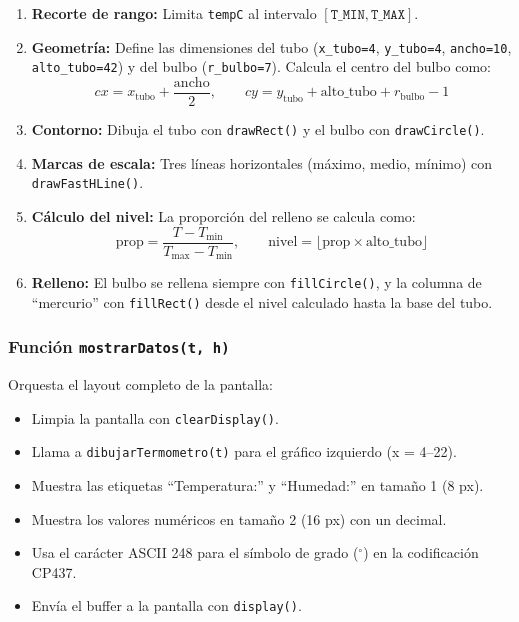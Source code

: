 \documentclass[12pt,a4paper]{article}
\begin{document}
\begin{enumerate}
    \item \textbf{Recorte de rango:} Limita \texttt{tempC} al intervalo $[\texttt{T\_MIN}, \texttt{T\_MAX}]$.
    \item \textbf{Geometría:} Define las dimensiones del tubo (\texttt{x\_tubo=4}, \texttt{y\_tubo=4}, \texttt{ancho=10}, \texttt{alto\_tubo=42}) y del bulbo (\texttt{r\_bulbo=7}). Calcula el centro del bulbo como:
    \begin{equation*}
        cx = x_{\text{tubo}} + \frac{\text{ancho}}{2}, \qquad cy = y_{\text{tubo}} + \text{alto\_tubo} + r_{\text{bulbo}} - 1
    \end{equation*}
    \item \textbf{Contorno:} Dibuja el tubo con \texttt{drawRect()} y el bulbo con \texttt{drawCircle()}.
    \item \textbf{Marcas de escala:} Tres líneas horizontales (máximo, medio, mínimo) con \texttt{drawFastHLine()}.
    \item \textbf{Cálculo del nivel:} La proporción del relleno se calcula como:
    \begin{equation*}
        \text{prop} = \frac{T - T_{\min}}{T_{\max} - T_{\min}}, \qquad \text{nivel} = \lfloor \text{prop} \times \text{alto\_tubo} \rfloor
    \end{equation*}
    \item \textbf{Relleno:} El bulbo se rellena siempre con \texttt{fillCircle()}, y la columna de ``mercurio'' con \texttt{fillRect()} desde el nivel calculado hasta la base del tubo.
\end{enumerate}

\subsubsection*{Función \texttt{mostrarDatos(t, h)}}
Orquesta el layout completo de la pantalla:
\begin{itemize}
    \item Limpia la pantalla con \texttt{clearDisplay()}.
    \item Llama a \texttt{dibujarTermometro(t)} para el gráfico izquierdo (x = 4--22).
    \item Muestra las etiquetas ``Temperatura:'' y ``Humedad:'' en tamaño 1 (8 px).
    \item Muestra los valores numéricos en tamaño 2 (16 px) con un decimal.
    \item Usa el carácter ASCII 248 para el símbolo de grado ($^\circ$) en la codificación CP437.
    \item Envía el buffer a la pantalla con \texttt{display()}.
\end{itemize}
\end{document}
